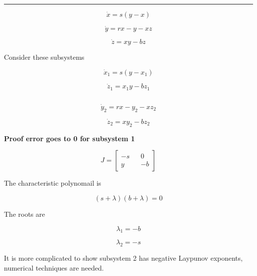 \documentclass{article}
\begin{document}
\begin{center}\rule{3in}{0.4pt}\end{center}

\begin{equation}
\dot{x} = s(y-x)
\end{equation}

\begin{equation}
\dot{y} = rx - y - xz
\end{equation}

\begin{equation}
\dot{z} = xy - bz
\end{equation}

Consider these subsystems

\begin{equation}
\dot{x}_1 = s(y-x_1)
\end{equation}

\begin{equation}
\dot{z}_1 = x_1y - bz_1
\end{equation}

$\:$

\begin{equation}
\dot{y}_2 = rx - y_2 - xz_2
\end{equation}

\begin{equation}
\dot{z}_2 = xy_2 - bz_2
\end{equation}

\textbf{Proof error goes to 0 for subsystem 1}

\begin{equation}
J = \left[ \begin{array}{ccc}
-s && 0\\
y && -b \end{array} \right]
\end{equation}

The characteristic polynomail is

\begin{equation}
(s+\lambda)(b+\lambda) = 0
\end{equation}

The roots are

\begin{equation}
\lambda_1 = -b
\end{equation}

\begin{equation}
\lambda_2 = -s
\end{equation}

It is more complicated to show subsystem 2 has negative Laypunov
exponents, numerical techniques are needed.
\end{document}
